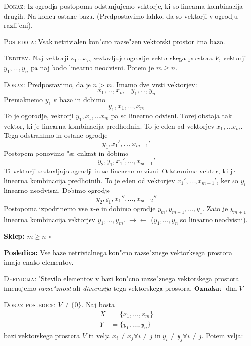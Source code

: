 \textsc{Dokaz:} Iz ogrodja postopoma odstanjujemo vektorje, ki so linearna kombinacija drugih. Na koncu ostane baza. (Predpostavimo lahko, da so vektorji v ogrodju razli"cni).

\textsc{Posledica:} Vsak netrivialen kon"cno razse"zen vektorski prostor ima bazo.

\textsc{Trditev:} Naj vektorji $x_1 \ldots x_m$ sestavljajo ogrodje vektorskega prostora $V$, vektorji $y_1, \ldots, y_n$ pa naj bodo linearno neodvisni. Potem je $m \geq n$.

\textsc{Dokaz:} Predpostavimo, da je $n > m$. Imamo dve vrsti vektorjev:
\begin{equation*}
x_1, \ldots , x_m \quad y_1, \ldots, y_n
\end{equation*}
Premaknemo $y_1$ v bazo in dobimo
\begin{equation*}
y_1, x_1, \ldots, x_m
\end{equation*}
To je ogorodje, vektorji $y_1, x_1, \ldots x_m$ pa so linearno odvisni. Torej obstaja tak vektor, ki je linearna kombinacija predhodnih. To je eden od vektorjev $x_1, \ldots x_m$. Tega odstranimo in ostane ogrodje
\begin{equation*}
y_1, x_1', \ldots, x_{m-1}'
\end{equation*}
Postopem ponovimo "se enkrat in dobimo
\begin{equation*}
y_2, y_1, x_1', \ldots, x_{m-1}'
\end{equation*}
Ti vektorji sestavljajo ogrodji in so linearno odvisni. Odstranimo vektor, ki je linearna kombinacija predhotnih. To je eden od vektorjev $x_1', \ldots, x_{m-1}'$, ker so $y_i$ linearno neodvisni. Dobimo ogrodje
\begin{equation*}
y_2, y_1, x_1'', \ldots, x_{m-2}''
\end{equation*}
Postopoma izpodrinemo vse $x$-e in dobimo ogrodje $y_m, y_{m-1}, \ldots, y_1$. Zato je $y_{m+1}$ linearna kombinacija vektorjev $y_1, \ldots, y_m$. $\rightarrow \leftarrow$ ($y_1, \ldots, y_n$ so linearno neodvisni).

\textbf{Sklep:} $m \geq n$ \hfill $\square$

\textbf{Posledica:} Vse baze netrivialnega kon"cno razse"znege vektorksega prostora imajo enako elementov.

\textsc{Definicija:} "Stevilo elementov v bazi kon"cno razse"znega vektorskega prostora imenujemo \emph{razse"znost} ali \emph{dimenzija} tega vektorskega prostora. \textbf{Oznaka:} $\dim V$

\textsc{Dokaz posledice:} $V \neq \{0\}$. Naj bosta
\begin{align*}
X &= \{x_1, \ldots, x_m\} \\
Y &= \{y_1, \ldots, y_n\}
\end{align*}
bazi vektorskega prostora $V$ in velja $x_i \neq x_j \forall i \neq j$ in $y_i \neq y_j \forall i \neq j$. Potem velja:

